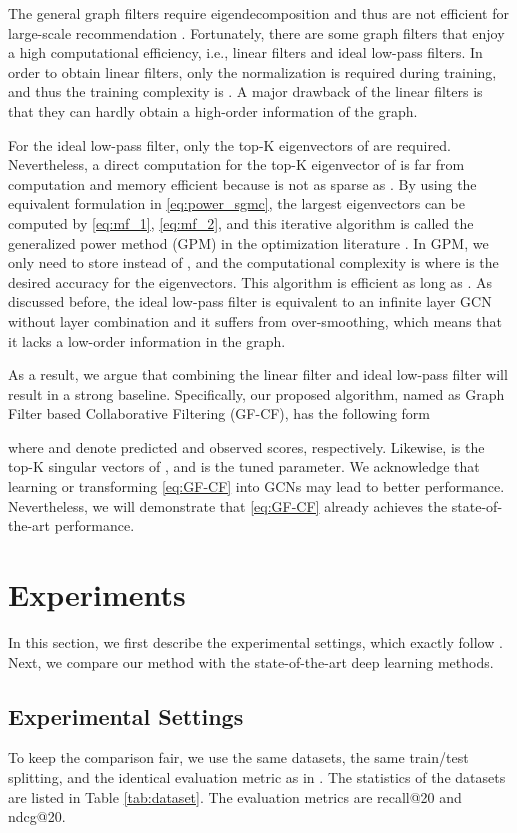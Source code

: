 \documentclass[sigconf]{acmart}
\begin{document}
The general graph filters require eigendecomposition and thus are not efficient for large-scale recommendation \cite{he2020lightgcn}. Fortunately, there are some graph filters that enjoy a  high computational efficiency, i.e., linear filters and ideal low-pass filters. In order to obtain linear filters, only the normalization is required during training, and thus the training complexity is . A major drawback of the linear filters is that they can hardly obtain a high-order information of the graph. 

For the ideal low-pass filter, only the top-K eigenvectors of  are required. Nevertheless, a direct computation for the  top-K eigenvector of  is far from computation and memory efficient because  is not as sparse as . By using the equivalent formulation in \eqref{eq:power_sgmc}, the largest eigenvectors can be computed by \eqref{eq:mf_1}, \eqref{eq:mf_2}, and this iterative algorithm is called the generalized power method (GPM) in the optimization literature \cite{journee2010generalized}. In GPM, we only need to store  instead of , and the computational complexity is  where  is the desired accuracy for the eigenvectors. This algorithm is efficient as long as . As discussed before, the ideal low-pass filter is equivalent to an infinite layer GCN without layer combination and it suffers from over-smoothing, which means that it lacks a low-order information in the graph. 

As a result, we argue that combining the linear filter and ideal low-pass filter will result in a strong baseline. Specifically, our proposed algorithm, named as Graph
Filter based Collaborative Filtering (GF-CF), has the following form

where  and  denote predicted and observed scores, respectively. Likewise,  is the top-K singular vectors of , and  is the tuned parameter. We acknowledge that learning  or transforming \eqref{eq:GF-CF} into GCNs may lead to better performance. Nevertheless, we will demonstrate that \eqref{eq:GF-CF} already achieves the state-of-the-art performance. 

\section{Experiments} \label{sec:exp}
In this section, we first describe the experimental settings, which exactly follow \cite{he2020lightgcn}. Next, we compare our method with the state-of-the-art deep learning methods.
\subsection{Experimental Settings}
To keep the comparison fair, we use the same datasets, the same train/test splitting, and the identical evaluation metric as in \cite{he2020lightgcn}. The statistics of the datasets are listed in Table \ref{tab:dataset}. The evaluation metrics are recall@20 and ndcg@20. 
\end{document}
